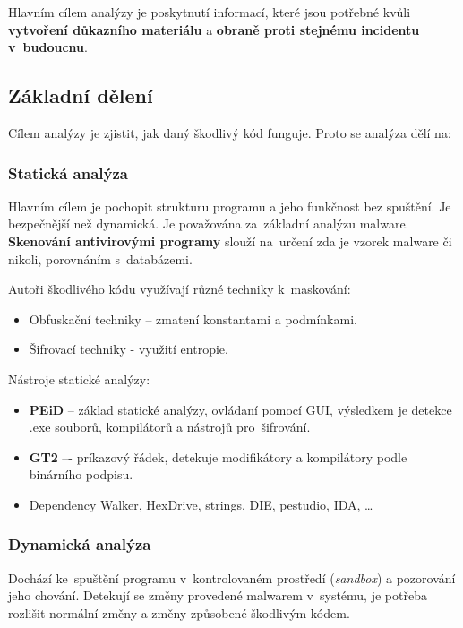 Hlavním cílem analýzy je poskytnutí informací, které jsou potřebné kvůli \textbf{vytvoření důkazního materiálu} a \textbf{obraně proti stejnému incidentu v~budoucnu}.  

\subsection{Základní dělení}

Cílem analýzy je zjistit, jak daný škodlivý kód funguje. Proto se analýza dělí na:

\subsubsection{Statická analýza}

Hlavním cílem je pochopit strukturu programu a jeho funkčnost bez spuštění.
Je bezpečnější než dynamická.
Je považována za~základní analýzu malware.
\textbf{Skenování antivirovými programy} slouží na~určení zda je vzorek malware či nikoli, porovnáním s~databázemi.

Autoři škodlivého kódu využívají různé techniky k~maskování:

\begin{itemize}
    \item Obfuskační techniky -- zmatení konstantami a podmínkami.
    \item Šifrovací techniky - využití entropie.
\end{itemize}

Nástroje statické analýzy:

\begin{itemize}
    \item \textbf{PEiD} -- základ statické analýzy, ovládaní pomocí GUI, výsledkem je detekce .exe souborů, kompilátorů a nástrojů pro~šifrování.
    \item \textbf{GT2} –- príkazový řádek, detekuje modifikátory a kompilátory podle binárního podpisu.
    \item Dependency Walker, HexDrive, strings, DIE, pestudio, IDA, \dots
\end{itemize}


\subsubsection{Dynamická analýza}

Dochází ke~spuštění programu v~kontrolovaném prostředí (\emph{sandbox}) a pozorování jeho chování.
Detekují se změny provedené malwarem v~systému, je potřeba rozlišit normální změny a změny způsobené škodlivým kódem.


